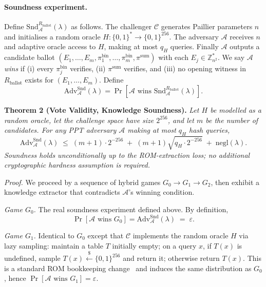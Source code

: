\paragraph{Soundness experiment.} Define $\mathrm{Snd}^{R_{\text{ballot}}}_{\mathcal{A}}(\lambda)$ as follows. The challenger $\mathcal{C}$ generates Paillier parameters $n$ and initialises a random oracle $H : \{0,1\}^* \to \{0,1\}^{256}$. The adversary $\mathcal{A}$ receives $n$ and adaptive oracle access to $H$, making at most $q_H$ queries. Finally $\mathcal{A}$ outputs a candidate ballot $(E_1, \ldots, E_m, \pi^{\text{bin}}_1, \ldots, \pi^{\text{bin}}_m, \pi^{\text{sum}})$ with each $E_j \in \mathbb{Z}_{n^2}^*$. We say $\mathcal{A}$ \emph{wins} if (i) every $\pi^{\text{bin}}_j$ verifies, (ii) $\pi^{\text{sum}}$ verifies, and (iii) no opening witness in $R_{\text{ballot}}$ exists for $(E_1, \ldots, E_m)$. Define
\begin{equation*}
    \mathrm{Adv}^{\mathrm{Snd}}_{\mathcal{A}}(\lambda) = \Pr\left[ \mathcal{A} \text{ wins } \mathrm{Snd}^{R_{\text{ballot}}}_{\mathcal{A}}(\lambda) \right].
\end{equation*}

\textbf{Theorem 2 (Vote Validity, Knowledge Soundness).} \textit{Let $H$ be modelled as a random oracle, let the challenge space have size $2^{256}$, and let $m$ be the number of candidates. For any PPT adversary $\mathcal{A}$ making at most $q_H$ hash queries,}
\begin{equation}
    \mathrm{Adv}^{\mathrm{Snd}}_{\mathcal{A}}(\lambda) \;\leq\; (m+1) \cdot 2^{-256} \;+\; (m+1) \sqrt{q_H \cdot 2^{-256}} \;+\; \mathrm{negl}(\lambda).
    \label{eq:t2-bound}
\end{equation}
\textit{Soundness holds unconditionally up to the ROM-extraction loss; no additional cryptographic hardness assumption is required.}

\textit{Proof.} We proceed by a sequence of hybrid games $G_0 \to G_1 \to G_2$, then exhibit a knowledge extractor that contradicts $\mathcal{A}$'s winning condition.

\emph{Game $G_0$.} The real soundness experiment defined above. By definition,
\begin{equation*}
    \Pr[\mathcal{A} \text{ wins } G_0] = \mathrm{Adv}^{\mathrm{Snd}}_{\mathcal{A}}(\lambda) \;=\; \varepsilon.
\end{equation*}

\emph{Game $G_1$.} Identical to $G_0$ except that $\mathcal{C}$ implements the random oracle $H$ via lazy sampling: maintain a table $T$ initially empty; on a query $x$, if $T(x)$ is undefined, sample $T(x) \stackrel{\$}{\leftarrow} \{0,1\}^{256}$ and return it; otherwise return $T(x)$. This is a standard ROM bookkeeping change~\cite{bellare1993rom} and induces the same distribution as $G_0$, hence $\Pr[\mathcal{A} \text{ wins } G_1] = \varepsilon$.

